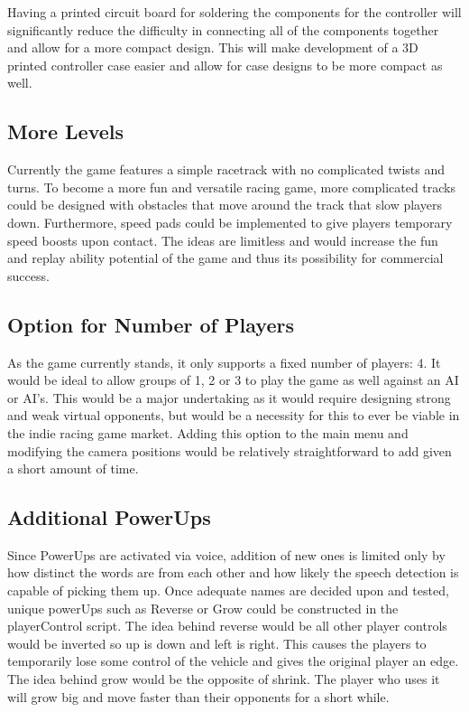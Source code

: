 \documentclass[a4paper,10pt]{article}
\begin{document}
Having a printed circuit board for soldering the components for the controller will significantly reduce the difficulty in connecting all of the components together and allow for a more compact design. This will make development of a 3D printed controller case easier and allow for case designs to be more compact as well.

\subsection{More Levels}
Currently the game features a simple racetrack with no complicated twists and turns. To become a more fun and versatile racing game, more complicated tracks could be designed with obstacles that move around the track that slow players down. Furthermore, speed pads could be implemented to give players temporary speed boosts upon contact. The ideas are limitless and would increase the fun and replay ability potential of the game and thus its possibility for commercial success. 

\subsection{Option for Number of Players}
As the game currently stands, it only supports a fixed number of players: 4. It would be ideal to allow groups of 1, 2 or 3 to play the game as well against an AI or AI's. This would be a major undertaking as it would require designing strong and weak virtual opponents, but would be a necessity for this to ever be viable in the indie racing game market. Adding this option to the main menu and modifying the camera positions would be relatively straightforward to add given a short amount of time.

\subsection{Additional PowerUps}
Since PowerUps are activated via voice, addition of new ones is limited only by how distinct the words are from each other and how likely the speech detection is capable of picking them up. Once adequate names are decided upon and tested, unique powerUps such as Reverse or Grow could be constructed in the playerControl script. The idea behind reverse would be all other player controls would be inverted so up is down and left is right. This causes the players to temporarily lose some control of the vehicle and gives the original player an edge. The idea behind grow would be the opposite of shrink. The player who uses it will grow big and move faster than their opponents for a short while.
\end{document}
